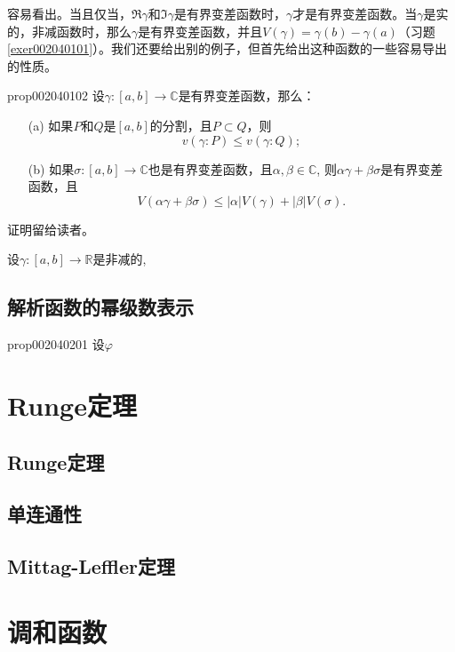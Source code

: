容易看出。当且仅当，$\Re{\gamma}$和$\Im{\gamma}$是有界变差函数时，$\gamma$才是有界变差函数。当$\gamma$是实的，非减函数时，那么$\gamma$是有界变差函数，并且$V(\gamma) = \gamma(b) - \gamma(a)$（习题\ref{exer002040101}）。我们还要给出别的例子，但首先给出这种函数的一些容易导出的性质。
\begin{proposition}{}{prop002040102}
设$\gamma:[a, b] \to \mathbb{C}$是有界变差函数，那么：
\begin{enumerate}
\item[(a)]如果$P$和$Q$是$[a,b]$的分割，且$P \subset Q$，则
\[
v(\gamma:P) \le v(\gamma:Q);
\]
\item[(b)]如果$\sigma:[a, b] \to \mathbb{C}$也是有界变差函数，且$\alpha, \beta \in \mathbb{C}$, 则$\alpha\gamma+\beta\sigma$是有界变差函数，且
\[
V(\alpha\gamma+\beta\sigma) \le |\alpha|V(\gamma) + |\beta|V(\sigma).
\]
\end{enumerate}
\end{proposition}

证明留给读者。

\begin{problemset}
\item\label{exer002040101}设$\gamma:[a, b] \to \mathbb{R}$是非减的,
\end{problemset}


\section{解析函数的幂级数表示}\label{section0020402}



\begin{proposition}{}{prop002040201}
设$\varphi$
\end{proposition}

\chapter{Runge定理}\label{chapter00208}

\section{Runge定理}\label{section0020801}


\section{单连通性}\label{section0020802}


\section{Mittag-Leffler定理}\label{section0020803}


\chapter{调和函数}\label{chapter00210}
















